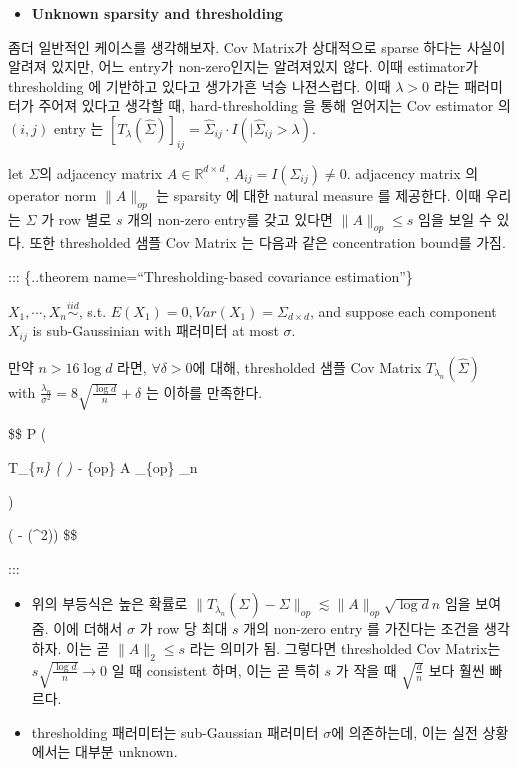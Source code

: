 \documentclass[
]{book}
\providecommand{\tightlist}{%
  \setlength{\itemsep}{0pt}\setlength{\parskip}{0pt}}
\begin{document}
{{{\begin{itemize}
\tightlist
\item
  \textbf{Unknown sparsity and thresholding}
\end{itemize}

좀더 일반적인 케이스를 생각해보자. Cov Matrix가 상대적으로 sparse 하다는 사실이 알려져 있지만, 어느 entry가 non-zero인지는 알려져있지 않다. 이때 estimator가 thresholding 에 기반하고 있다고 생가가흔 넉승 나젼스럽다. 이때 \(\lambda >0\) 라는 패러미터가 주어져 있다고 생각할 때, hard-thresholding 을 통해 얻어지는 Cov estimator 의 \((i,j)\) entry 는 \([T_\lambda (\hat \Sigma)]_{ij} = \hat \Sigma_{ij} \cdot I(|\hat \Sigma_{ij}>\lambda)\).

let \(\Sigma\)의 adjacency matrix \(A \in \mathbb R^{d \times d}\), \(A_{ij} = I(\Sigma_{ij}) \not = 0\). adjacency matrix 의 operator norm \(\| A \|_{op}\) 는 sparsity 에 대한 natural measure 를 제공한다. 이때 우리는 \(\Sigma\) 가 row 별로 \(s\) 개의 non-zero entry를 갖고 있다면 \(\| A \|_{op} \le s\) 임을 보일 수 있다. 또한 thresholded 샘플 Cov Matrix 는 다음과 같은 concentration bound를 가짐.

::: \{..theorem name=``Thresholding-based covariance estimation''\}

\(X_1 , \cdots, X_n \overset {iid} \sim\), s.t. \(E(X_1) = 0, Var(X_1) = \Sigma_{d \times d}\), and suppose each component \(X_{ij}\) is sub-Gaussinian with 패러미터 at most \(\sigma\).

만약 \(n > 16 \log d\) 라면, \(\forall \delta>0\)에 대해, thresholded 샘플 Cov Matrix \(T_{\lambda_n} (\hat \Sigma)\) with \(\frac{\lambda_n}{\sigma^2} = 8 \sqrt{\frac{\log d}{n}} + \delta\) 는 이하를 만족한다.

\$\$
P \Big (

\textbar{} T\_\{\lambda\emph{n\} ( \hat \Sigma ) - \Sigma \textbar{}}\{op\}  \textbar{} A \textbar\_\{op\} \cdot \lambda\_n

\Big)

 \exp \Big( - (\delta \wedge \delta\^{}2)\Big)
\$\$

:::

\begin{itemize}
\item
  위의 부등식은 높은 확률로 \(\| T_{\lambda_n} ( \hat \Sigma ) - \Sigma \|_{op} \lesssim \| A \|_{op} \sqrt{\log d}{n}\) 임을 보여줌. 이에 더해서 \(\sigma\) 가 row 당 최대 \(s\) 개의 non-zero entry 를 가진다는 조건을 생각하자. 이는 곧 \(\|A\|_2 \le s\) 라는 의미가 됨. 그렇다면 thresholded Cov Matrix는 \(s\sqrt{\frac{\log d}{n}}→0\) 일 때 consistent 하며, 이는 곧 특히 \(s\) 가 작을 때 \(\sqrt{\frac{d}{n}}\) 보다 훨씬 빠르다.
\item
  thresholding 패러미터는 sub-Gaussian 패러미터 \(\sigma\)에 의존하는데, 이는 실전 상황에서는 대부분 unknown.
\end{itemize}

}}}
\end{document}
